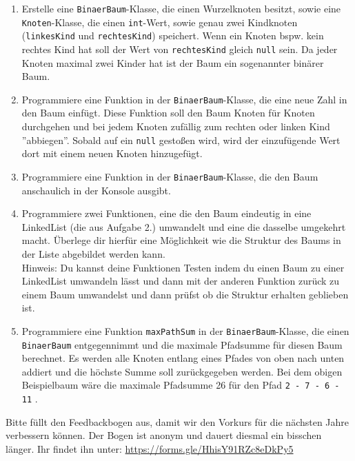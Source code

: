 \documentclass{../../sheet}
\begin{document}
\begin{enumerate}
    \item Erstelle eine \texttt{BinaerBaum}-Klasse, die einen Wurzelknoten besitzt, sowie eine \texttt{Knoten}-Klasse, die einen \texttt{int}-Wert, sowie genau zwei Kindknoten (\texttt{linkesKind} und \texttt{rechtesKind}) speichert. Wenn ein Knoten bspw. kein rechtes Kind hat soll der Wert von \texttt{rechtesKind} gleich \texttt{null} sein. Da jeder Knoten maximal zwei Kinder hat ist der Baum ein sogenannter binärer Baum.
    \item Programmiere eine Funktion in der \texttt{BinaerBaum}-Klasse, die eine neue Zahl in den Baum einfügt. Diese Funktion soll den Baum Knoten für Knoten durchgehen und bei jedem Knoten zufällig zum rechten oder linken Kind ''abbiegen''. Sobald auf ein \texttt{null} gestoßen wird, wird der einzufügende Wert dort mit einem neuen Knoten hinzugefügt.
    \item Programmiere eine Funktion in der \texttt{BinaerBaum}-Klasse, die den Baum anschaulich in der Konsole ausgibt.
    \item Programmiere zwei Funktionen, eine die den Baum eindeutig in eine LinkedList (die aus Aufgabe 2.) umwandelt und eine die dasselbe umgekehrt macht. Überlege dir hierfür eine Möglichkeit wie die Struktur des Baums in der Liste abgebildet werden kann.\\
    Hinweis: Du kannst deine Funktionen Testen indem du einen Baum zu einer LinkedList umwandeln lässt und dann mit der anderen Funktion zurück zu einem Baum umwandelst und dann prüfst ob die Struktur erhalten geblieben ist.
    \item Programmiere eine Funktion \texttt{maxPathSum} in der \texttt{BinaerBaum}-Klasse, die einen \texttt{BinaerBaum} entgegennimmt und die maximale Pfadsumme für diesen Baum berechnet. Es werden alle Knoten entlang eines Pfades von oben nach unten addiert und die höchste Summe soll zurückgegeben werden. Bei dem obigen Beispielbaum wäre die maximale Pfadsumme 26 für den Pfad \texttt{2 - 7 - 6 - 11} . 
\end{enumerate}
\newpage
{}
Bitte füllt den Feedbackbogen aus, damit wir den Vorkurs für die nächsten Jahre verbessern können. Der Bogen ist anonym und dauert diesmal ein bisschen länger. \newline Ihr findet ihn unter: \url{https://forms.gle/HhisY91RZc8eDkPy5}
\end{document}
